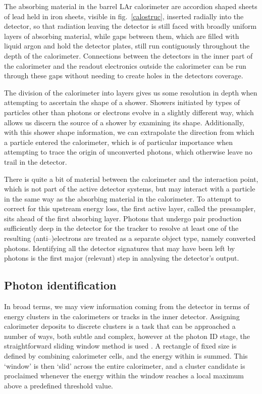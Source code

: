 The absorbing material in the barrel LAr calorimeter are accordion shaped sheets of lead held in iron sheets, visible in fig.~\ref{calostruc}, inserted radially into the detector, so that radiation leaving the detector is still faced with broadly uniform layers of absorbing material, while gaps between them, which are filled with liquid argon and hold the detector plates, still run contiguously throughout the depth of the calorimeter. Connections between the detectors in the inner part of the calorimeter and the readout electronics outside the calorimeter can be run through these gaps without needing to create holes in the detectors coverage.

The division of the calorimeter into layers gives us some resolution in depth when attempting to ascertain the shape of a shower. Showers initiated by types of particles other than photons or electrons evolve in a slightly different way, which allows us discern the source of a shower by examining its shape. Additionally, with this shower shape information, we can extrapolate the direction from which a particle entered the calorimeter, which is of particular importance when attempting to trace the origin of unconverted photons, which otherwise leave no trail in the detector.

There is quite a bit of material between the calorimeter and the interaction point, which is not part of the active detector systems, but may interact with a particle in the same way as the absorbing material in the calorimeter. To attempt to correct for this upstream energy loss, the first active layer, called the presampler, sits ahead of the first absorbing layer. Photons that undergo pair production sufficiently deep in the detector for the tracker to resolve at least one of the resulting (anti--)electrons are treated as a separate object type, namely converted photons. Identifying all the detector signatures that may have been left by photons is the first major (relevant) step in analysing the detector's output.

\subsection{Photon identification}
In broad terms, we may view information coming from the detector in terms of energy clusters in the calorimeters or tracks in the inner detector. Assigning calorimeter deposits to discrete clusters is a task that can be approached a number of ways, both subtle and complex, however at the photon ID stage, the straightforward sliding window method is used \cite{atlascluster:sw}. A rectangle of fixed size is defined by combining calorimeter cells, and the energy within is summed. This `window' is then `slid' across the entire calorimeter, and a cluster candidate is proclaimed whenever the energy within the window reaches a local maximum above a predefined threshold value.

